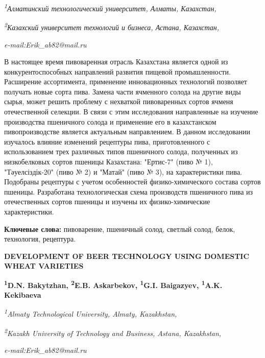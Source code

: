 \begin{affiliation}
\emph{\textsuperscript{1}Алматинский технологический университет, Алматы, Казахстан,}

\emph{\textsuperscript{2}Казахский университет технологий и бизнеса, Астана, Казахстан,}

\emph{e-mail:Erik\_ab82@mail.ru}
\end{affiliation}

В настоящее время пивоваренная отрасль Казахстана является одной из
конкурентоспособных направлений развития пищевой промышленности.
Расширение ассортимента, применение инновационных технологий позволяет
получать новые сорта пива. Замена части ячменного солода на другие виды
сырья, может решить проблему с нехваткой пивоваренных сортов ячменя
отечественной селекции. В связи с этим исследования направленные на
изучение производства пшеничного солода и применение его в казахстанском
пивопроизводстве является актуальным направлением. В данном исследовании
изучалось влияние изменений рецептуры пива, приготовленного с
использованием трех различных типов пшеничного солода, полученных из
низкобелковых сортов пшеницы Казахстана: "Ертис-7" (пиво № 1),
"Тәуелсіздік-20" (пиво № 2) и "Матай" (пиво № 3), на характеристики
пива. Подобраны рецептуры с учетом особенностей физико-химического
состава сортов пшеницы. Разработана технологическая схема производств
пшеничного пива из отечественных сортов пшеницы и изучены их
физико-химические характеристики.

{\bfseries Ключевые слова:} пивоварение, пшеничный солод, светлый солод,
белок, технология, рецептура.

\begin{articleheader}
{\bfseries DEVELOPMENT OF BEER TECHNOLOGY USING DOMESTIC WHEAT VARIETIES}

{\bfseries
\textsuperscript{1}D.N. Bakytzhan,
\textsuperscript{2}E.B. Askarbekov\textsuperscript{\envelope },
\textsuperscript{1}G.I. Baigazyev,
\textsuperscript{1}A.K. Kekibaeva}
\end{articleheader}

\begin{affiliation}
\emph{\textsuperscript{1}Almaty Technological University, Almaty, Kazakhstan,}

\emph{\textsuperscript{2}Kazakh University of Technology and Business, Astana, Kazakhstan,}

\emph{e-mail:Erik\_ab82@mail.ru}
\end{affiliation}

